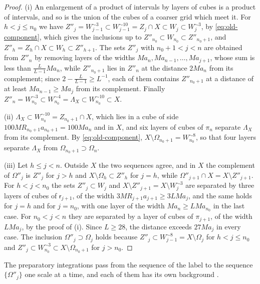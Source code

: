 \documentclass[11pt]{preprint}
\numberwithin{equation}{section}
\begin{document}
\begin{proof}
(i) An enlargement of a product of intervals by layers of cubes is a product of intervals, and so is the union of the cubes of a coarser grid which meet it. For $h < j \leqslant n_0$ we have $Z''_j = W_{j-1}^{\sim3} \subset W_{j-1}^{\sim10} = Z_j \cap X \subset W_j \subset W_j^{\sim3}$, by \eqref{eq:old-component}, which gives the inclusions up to $Z''_{n_0} \subset W_{n_0} \subset Z''_{n_0+1}$, and $Z''_h = Z_h \cap X \subset W_h \subset Z''_{h+1}$. The sets $Z''_j$ with $n_0 + 1 < j < n$ are obtained from $Z''_n$ by removing layers of the widths $Ma_n, Ma_{n-1}, \dots, Ma_{j+1}$, whose sum is less than $\frac{L}{L-1}Ma_n$, while $Z''_{n_0+1}$ lies in $Z''_n$ at the distance $2Ma_n$ from its complement; since $2 - \frac{L}{L-1} \geqslant L^{-1}$, each of them contains $Z''_{n_0+1}$ at a distance of at least $Ma_{n-1} \geqslant Ma_{j}$ from its complement. Finally $Z''_n = W_{n_0}^{\sim3} \subset W_{n_0}^{\sim4} = \Lambda_X \subset W_{n_0}^{\sim10} \subset X$.

(ii) $\Lambda_X \subset W_{n_0}^{\sim10} = Z_{n_0+1} \cap X$, which lies in a cube of side $100MR_{n_0+1}a_{n_0+1} = 100Ma_n$ and in $X$, and six layers of cubes of $\pi_n$ separate $\Lambda_X$ from its complement. By \eqref{eq:old-component}, $X \setminus \Omega_{n_0+1} = W_{n_0}^{\sim8}$, so that four layers separate $\Lambda_X$ from $\Omega_{n_0+1} \supset \Omega_n$.

(iii) Let $h \leqslant j < n$. Outside $X$ the two sequences agree, and in $X$ the complement of $\Omega''_j$ is $Z''_j$ for $j > h$ and $X \setminus \Omega_h \subset Z''_h$ for $j = h$, while $\Omega''_{j+1} \cap X = X \setminus Z''_{j+1}$. For $h < j < n_0$ the sets $Z''_j \subset W_j$ and $X \setminus Z''_{j+1} = X \setminus W_j^{\sim3}$ are separated by three layers of cubes of $\mathsf r_{j+1}$, of the width $3MR_{j+1}a_{j+1} \geqslant 3LMa_j$, and the same holds for $j = h$ and for $j = n_0$, with one layer of the width $Ma_n \geqslant LMa_{n_0}$ in the last case. For $n_0 < j < n$ they are separated by a layer of cubes of $\pi_{j+1}$, of the width $LMa_j$, by the proof of (i). Since $L \geqslant 28$, the distance exceeds $27Ma_j$ in every case. The inclusion $\Omega''_j \supset \Omega_j$ holds because $Z''_j \subset W_{j-1}^{\sim8} = X \setminus \Omega_j$ for $h < j \leqslant n_0$ and $Z''_j \subset W_{n_0}^{\sim3} \subset X \setminus \Omega_{n_0+1}$ for $j > n_0$.
\end{proof}

The preparatory integrations pass from the sequence of the label to the sequence $\{ \Omega''_j \}$ one scale at a time, and each of them has its own background \cite[(1.14)--(1.21)]{BalabanLFR1}.
\end{document}

